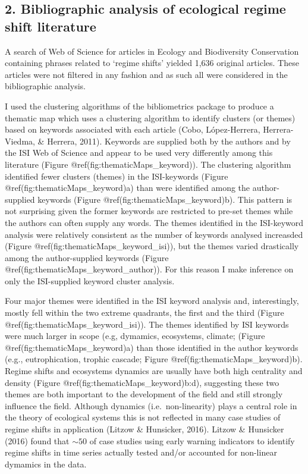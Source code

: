 \documentclass[12pt,twoside,openany]{reedthesis}
\begin{document}
\hypertarget{bibliographic-analysis-of-ecological-regime-shift-literature-1}{%
\subsection{2. Bibliographic analysis of ecological regime shift literature}\label{bibliographic-analysis-of-ecological-regime-shift-literature-1}}

A search of Web of Science for articles in Ecology and Biodiversity Conservation containing phrases related to `regime shifts' yielded 1,636 original articles. These articles were not filtered in any fashion and as such all were considered in the bibliographic analysis.

I used the clustering algorithms of the bibliometrics package to produce a thematic map which uses a clustering algorithm to identify clusters (or themes) based on keywords associated with each article (Cobo, López-Herrera, Herrera-Viedma, \& Herrera, 2011). Keywords are supplied both by the authors and by the ISI Web of Science and appear to be used very differently among this literature (Figure @ref(fig:thematicMaps\_keyword)). The clustering algorithm identified fewer clusters (themes) in the ISI-keywords (Figure @ref(fig:thematicMaps\_keyword)a) than were identified among the author-supplied keywords (Figure @ref(fig:thematicMaps\_keyword)b). This pattern is not surprising given the former keywords are restricted to pre-set themes while the authors can often supply any words. The themes identified in the ISI-keyword analysis were relatively consistent as the number of keywords analysed increasded (Figure @ref(fig:thematicMaps\_keyword\_isi)), but the themes varied drastically among the author-supplied keywords (Figure @ref(fig:thematicMaps\_keyword\_author)). For this reason I make inference on only the ISI-supplied keyword cluster analysis.

Four major themes were identified in the ISI keyword analysis and, interestingly, mostly fell within the two extreme quadrants, the first and the third (Figure @ref(fig:thematicMaps\_keyword\_isi)). The themes identified by ISI keywords were much larger in scope (e.g, dymamics, ecosystems, climate; (Figure @ref(fig:thematicMaps\_keyword)a) than those identified in the author keywords (e.g., eutrophication, trophic cascade; Figure @ref(fig:thematicMaps\_keyword)b). Regime shifts and ecosystems dynamics are usually have both high centrality and density (Figure @ref(fig:thematicMaps\_keyword)b:d), suggesting these two themes are both important to the development of the field and still strongly influence the field. Although dynamics (i.e.~non-linearity) plays a central role in the theory of ecological systems this is not reflected in many case studies of regime shifts in application (Litzow \& Hunsicker, 2016). Litzow \& Hunsicker (2016) found that \(\sim50%
\) of case studies using early warning indicators to identify regime shifts in time series actually tested and/or accounted for non-linear dymamics in the data.
\end{document}
